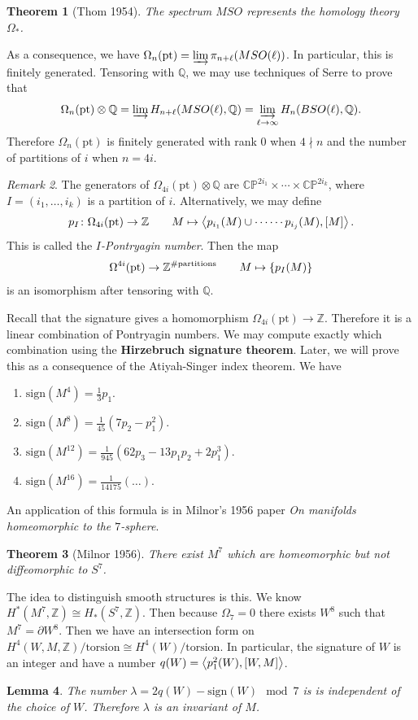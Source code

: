 \documentclass[leqno, openany]{memoir}
\newtheorem{thm}{Theorem}[section]
\newtheorem{lem}[thm]{Lemma}
\theoremstyle{definition}
\theoremstyle{remark}
\newtheorem{rmk}[thm]{Remark}
\theoremstyle{plain}
\theoremstyle{definition}
\theoremstyle{remark}
\newcommand{\C}{\mathbb{C}}
\newcommand{\Z}{\mathbb{Z}}
\newcommand{\Q}{\mathbb{Q}}
\renewcommand{\P}{\mathbb{P}}
\newcommand{\mr}[1]{\mathrm{#1}}
\begin{document}
\begin{thm}[Thom 1954]
    The spectrum $MSO$ represents the homology theory $\Omega_*$.
\end{thm}

As a consequence, we have $\Omega_n(\mr{pt}) = \varinjlim \pi_{n+\ell}(MSO(\ell))$. In particular, this is finitely generated. Tensoring with $\Q$, we may use techniques of Serre to prove that
\[ \Omega_n(\mr{pt}) \otimes \Q = \varinjlim H_{n+\ell} (MSO(\ell), \Q) = \varinjlim_{\ell \to \infty} H_n(BSO(\ell), \Q). \]
Therefore $\Omega_n(\mr{pt})$ is finitely generated with rank $0$ when $4 \nmid n$ and the number of partitions of $i$ when $n = 4i$.

\begin{rmk}
    The generators of $\Omega_{4i}(\mr{pt}) \otimes \Q$ are $\C\P^{2i_1} \times \cdots \times \C\P^{2i_k}$, where $I = (i_1, \ldots, i_k)$ is a partition of $i$. Alternatively, we may define
    \[ p_I \colon \Omega_{4i} (\mr{pt}) \to \Z \qquad M \mapsto \ev{p_{i_1}(M) \cup \cdots \cdots p_{i_j}(M), [M]}. \]
    This is called the \textit{$I$-Pontryagin number}. Then the map
    \[ \Omega^{4i}(\mr{pt}) \to \Z^{\# \text{partitions}} \qquad M \mapsto \qty{p_I(M)} \]
    is an isomorphism after tensoring with $\Q$. 

    Recall that the signature gives a homomorphism $\Omega_{4i}(\mr{pt}) \to \Z$. Therefore it is a linear combination of Pontryagin numbers. We may compute exactly which combination using the \textbf{Hirzebruch signature theorem}. Later, we will prove this as a consequence of the Atiyah-Singer index theorem. We have
    \begin{enumerate}
        \item $\mr{sign}(M^4) = \frac{1}{3} p_1$.
        \item $\mr{sign}(M^8) = \frac{1}{45} (7p_2 - p_1^2)$.
        \item $\mr{sign}(M^{12}) = \frac{1}{945}(62p_3 - 13 p_1p_2 + 2 p_1^3)$.
        \item $\mr{sign}(M^{16}) = \frac{1}{14175}(\ldots)$.
    \end{enumerate}
\end{rmk}
An application of this formula is in Milnor's 1956 paper \textit{On manifolds homeomorphic to the $7$-sphere}. 
\begin{thm}[Milnor 1956]
    There exist $M^7$ which are homeomorphic but not diffeomorphic to $S^7$.
\end{thm}
The idea to distinguish smooth structures is this. We know $H^*(M^7, \Z) \cong H_*(S^7, \Z)$. Then because $\Omega_7 = 0$ there exists $W^8$ such that $M^7 = \partial W^8$. Then we have an intersection form on $H^4(W, M, \Z)/\text{torsion} \cong H^4(W)/\text{torsion}$. In particular, the signature of $W$ is an integer and have a number $q(W) = \ev{p_1^2(W), [W,M]}$.
\begin{lem}
    The number $\lambda = 2q(W) - \text{sign}(W) \mod 7$ is is independent of the choice of $W$. Therefore $\lambda$ is an invariant of $M$. 
\end{lem}
\end{document}
